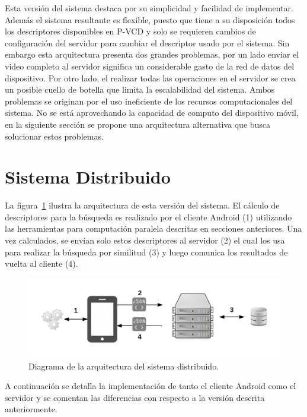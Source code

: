 Esta versión del sistema destaca por su simplicidad y facilidad de implementar. Además el sistema resultante es flexible, puesto que tiene a su disposición todos los descriptores disponibles en P-VCD y solo se requieren cambios de configuración del servidor para cambiar el descriptor usado por el sistema. Sin embargo esta arquitectura presenta dos grandes problemas, por un lado enviar el video completo al servidor significa un considerable gasto de la red de datos del dispositivo. Por otro lado, el realizar todas las operaciones en el servidor se crea un posible cuello de botella que limita la escalabilidad del sistema. Ambos problemas se originan por el uso ineficiente de los recursos computacionales del sistema. No se está aprovechando la capacidad de computo del dispositivo móvil, en la siguiente sección se propone una arquitectura alternativa que busca solucionar estos problemas.


\section{Sistema Distribuido}

La figura~\ref{arquitectura_distribuida} ilustra la arquitectura de esta versión del sistema. El cálculo de descriptores para la búsqueda es realizado por el cliente Android (1) utilizando las herramientas para computación paralela descritas en secciones anteriores. Una vez calculados, se envían solo estos descriptores al servidor (2) el cual los usa para realizar la búsqueda por similitud (3) y luego comunica los resultados de vuelta al cliente (4).

	\begin{figure}[!h]
		\centering
		\includegraphics[scale=1]{imagenes/cap4/arquitectura_distribuida.png}
		\caption{Diagrama de la arquitectura del sistema distribuido.}
		\label{arquitectura_distribuida}
	\end{figure}

A continuación se detalla la implementación de tanto el cliente Android como el servidor y se comentan las diferencias con respecto a la versión descrita anteriormente.

